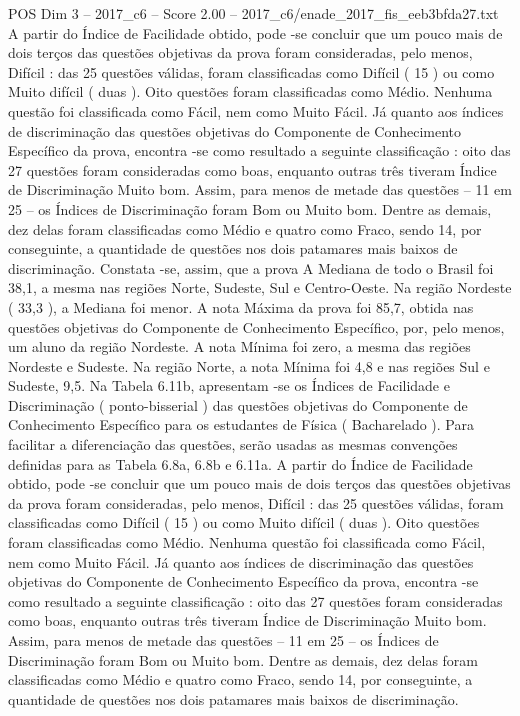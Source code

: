 \begin{textsample}{POS Dim 3 – 2017\_c6 – Score 2.00 – 2017\_c6/enade\_2017\_fis\_eeb3bfda27.txt}
A partir do Índice de Facilidade obtido, pode -se concluir que um pouco mais de dois terços das questões objetivas da prova foram consideradas, pelo menos, Difícil : das 25 questões válidas, foram classificadas como Difícil ( 15 ) ou como Muito difícil ( duas ).
Oito questões foram classificadas como Médio.
Nenhuma questão foi classificada como Fácil, nem como Muito Fácil.
Já quanto aos índices de discriminação das questões objetivas do Componente de Conhecimento Específico da prova, encontra -se como resultado a seguinte classificação : oito das 27 questões foram consideradas como boas, enquanto outras três tiveram Índice de Discriminação Muito bom.
Assim, para menos de metade das questões – 11 em 25 – os Índices de Discriminação foram Bom ou Muito bom.
Dentre as demais, dez delas foram classificadas como Médio e quatro como Fraco, sendo 14, por conseguinte, a quantidade de questões nos dois patamares mais baixos de discriminação.
Constata -se, assim, que a prova A Mediana de todo o Brasil foi 38,1, a mesma nas regiões Norte, Sudeste, Sul e Centro-Oeste.
Na região Nordeste ( 33,3 ), a Mediana foi menor.
A nota Máxima da prova foi 85,7, obtida nas questões objetivas do Componente de Conhecimento Específico, por, pelo menos, um aluno da região Nordeste.
A nota Mínima foi zero, a mesma das regiões Nordeste e Sudeste.
Na região Norte, a nota Mínima foi 4,8 e nas regiões Sul e Sudeste, 9,5.
Na Tabela 6.11b, apresentam -se os Índices de Facilidade e Discriminação ( ponto-bisserial ) das questões objetivas do Componente de Conhecimento Específico para os estudantes de Física ( Bacharelado ).
Para facilitar a diferenciação das questões, serão usadas as mesmas convenções definidas para as Tabela 6.8a, 6.8b e 6.11a.
A partir do Índice de Facilidade obtido, pode -se concluir que um pouco mais de dois terços das questões objetivas da prova foram consideradas, pelo menos, Difícil : das 25 questões válidas, foram classificadas como Difícil ( 15 ) ou como Muito difícil ( duas ).
Oito questões foram classificadas como Médio.
Nenhuma questão foi classificada como Fácil, nem como Muito Fácil.
Já quanto aos índices de discriminação das questões objetivas do Componente de Conhecimento Específico da prova, encontra -se como resultado a seguinte classificação : oito das 27 questões foram consideradas como boas, enquanto outras três tiveram Índice de Discriminação Muito bom.
Assim, para menos de metade das questões – 11 em 25 – os Índices de Discriminação foram Bom ou Muito bom.
Dentre as demais, dez delas foram classificadas como Médio e quatro como Fraco, sendo 14, por conseguinte, a quantidade de questões nos dois patamares mais baixos de discriminação.

\end{textsample}
